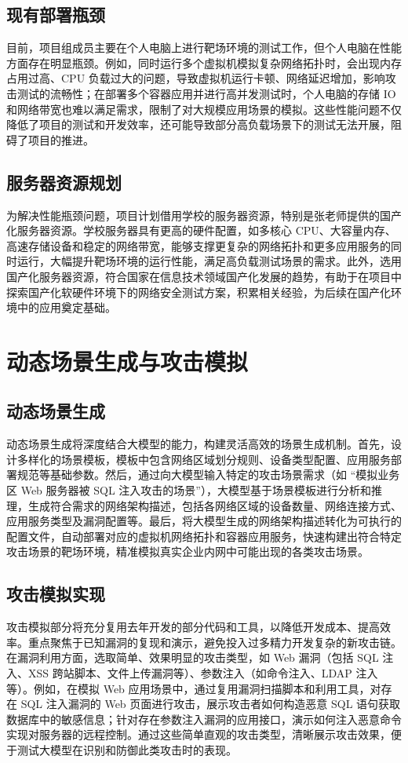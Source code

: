 \documentclass[lang=cn,10pt]{elegantbook}
\begin{document}
\subsection{现有部署瓶颈}
目前，项目组成员主要在个人电脑上进行靶场环境的测试工作，但个人电脑在性能方面存在明显瓶颈。例如，同时运行多个虚拟机模拟复杂网络拓扑时，会出现内存占用过高、CPU 负载过大的问题，导致虚拟机运行卡顿、网络延迟增加，影响攻击测试的流畅性；在部署多个容器应用并进行高并发测试时，个人电脑的存储 IO 和网络带宽也难以满足需求，限制了对大规模应用场景的模拟。这些性能问题不仅降低了项目的测试和开发效率，还可能导致部分高负载场景下的测试无法开展，阻碍了项目的推进。

\subsection{服务器资源规划}
为解决性能瓶颈问题，项目计划借用学校的服务器资源，特别是张老师提供的国产化服务器资源。学校服务器具有更高的硬件配置，如多核心 CPU、大容量内存、高速存储设备和稳定的网络带宽，能够支撑更复杂的网络拓扑和更多应用服务的同时运行，大幅提升靶场环境的运行性能，满足高负载测试场景的需求。此外，选用国产化服务器资源，符合国家在信息技术领域国产化发展的趋势，有助于在项目中探索国产化软硬件环境下的网络安全测试方案，积累相关经验，为后续在国产化环境中的应用奠定基础。

\section{动态场景生成与攻击模拟}
\subsection{动态场景生成}
动态场景生成将深度结合大模型的能力，构建灵活高效的场景生成机制。首先，设计多样化的场景模板，模板中包含网络区域划分规则、设备类型配置、应用服务部署规范等基础参数。然后，通过向大模型输入特定的攻击场景需求（如 “模拟业务区 Web 服务器被 SQL 注入攻击的场景”），大模型基于场景模板进行分析和推理，生成符合需求的网络架构描述，包括各网络区域的设备数量、网络连接方式、应用服务类型及漏洞配置等。最后，将大模型生成的网络架构描述转化为可执行的配置文件，自动部署对应的虚拟机网络拓扑和容器应用服务，快速构建出符合特定攻击场景的靶场环境，精准模拟真实企业内网中可能出现的各类攻击场景。

\subsection{攻击模拟实现}
攻击模拟部分将充分复用去年开发的部分代码和工具，以降低开发成本、提高效率。重点聚焦于已知漏洞的复现和演示，避免投入过多精力开发复杂的新攻击链。在漏洞利用方面，选取简单、效果明显的攻击类型，如 Web 漏洞（包括 SQL 注入、XSS 跨站脚本、文件上传漏洞等）、参数注入（如命令注入、LDAP 注入等）。例如，在模拟 Web 应用场景中，通过复用漏洞扫描脚本和利用工具，对存在 SQL 注入漏洞的 Web 页面进行攻击，展示攻击者如何构造恶意 SQL 语句获取数据库中的敏感信息；针对存在参数注入漏洞的应用接口，演示如何注入恶意命令实现对服务器的远程控制。通过这些简单直观的攻击类型，清晰展示攻击效果，便于测试大模型在识别和防御此类攻击时的表现。
\end{document}

